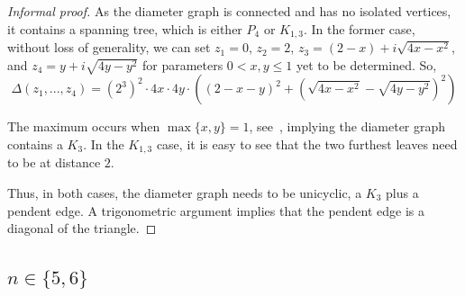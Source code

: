\documentclass{article}
\theoremstyle{definition}
\let\le\leqslant
\begin{document}
\begin{proof}[Informal proof]
    As the diameter graph is connected and has no isolated vertices, it contains a spanning tree,
which is either $P_4$ or $K_{1,3}$.
    In the former case, without loss of generality, we can set $z_1=0$, $z_2=2$, $z_3=(2-x)+ i\sqrt{4x-x^2}$, and $z_4=y+ i\sqrt{4y-y^2}$ for parameters $0<x,y \le 1$ yet to be determined.
    So,
    $$
    \Delta(z_1,...,z_4)= (2^3)^2 \cdot 4x \cdot 4y \cdot \left( (2-x-y)^2 + (\sqrt{4x-x^2}-\sqrt{4y-y^2})^2\right)
    $$

    The maximum occurs when $\max\{x,y\}=1$, see~\cite[\texttt{Computation_P4_n4}]{githubRepo}, implying the diameter graph contains a $K_3.$ 
In the $K_{1,3}$ case, it is easy to see that the two furthest leaves need to be at distance $2$.

Thus, in both cases, the diameter graph needs to be unicyclic, a $K_3$ plus a pendent edge. A trigonometric argument implies that the pendent edge is a diagonal of the triangle. 
\end{proof}





















\subsection{$n \in \{5,6\}$}
\end{document}

